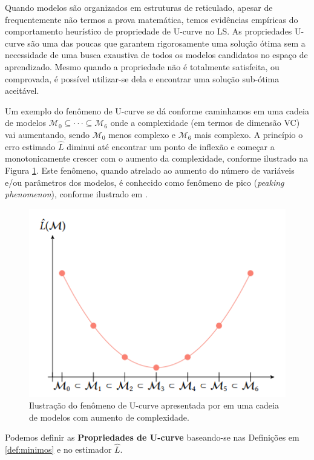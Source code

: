 Quando modelos são organizados em estruturas de reticulado, apesar de frequentemente não termos a prova matemática, temos evidências empíricas do comportamento heurístico de propriedade de U-curve no LS. As propriedades U-curve são uma das poucas que garantem rigorosamente uma solução ótima sem a necessidade de uma busca exaustiva de todos os modelos candidatos no espaço de aprendizado. Mesmo quando a propriedade não é totalmente satisfeita, ou comprovada, é possível utilizar-se dela e encontrar uma solução sub-ótima aceitável.

Um exemplo do fenômeno de U-curve se dá conforme caminhamos em uma cadeia de modelos $\mathcal{M}_{0} \subseteq \cdot \cdot \cdot \subseteq \mathcal{M}_{6}$ onde a complexidade (em termos de dimensão VC) vai aumentando, sendo $\mathcal{M}_{0}$ menos complexo e $\mathcal{M}_{6}$ mais complexo. A princípio o erro estimado $\hat{L}$ diminui até encontrar um ponto de inflexão e começar a monotonicamente crescer com o aumento da complexidade, conforme ilustrado na Figura \ref{fig:ucurve}. Este fenômeno, quando atrelado ao aumento do número de variáveis e/ou parâmetros dos modelos, é conhecido como fenômeno de pico (\textit{peaking phenomenon}), conforme ilustrado em \cite{ucurve:06,ucurve:01, ucurve:02, ucurve:03, ucurve:05, ucurve:04}.

\begin{figure}
  \centering
  \includegraphics[width=.4\textwidth]{figuras/u_curve.png}
  \caption{Ilustração do fenômeno de U-curve apresentada por \cite{DIEGO:01} em uma cadeia de modelos com aumento de complexidade.\label{fig:ucurve}}
\end{figure}

 
 Podemos definir as \textbf{Propriedades de U-curve} baseando-se nas Definições em \ref{def:minimos} e no estimador $\hat{L}$.

